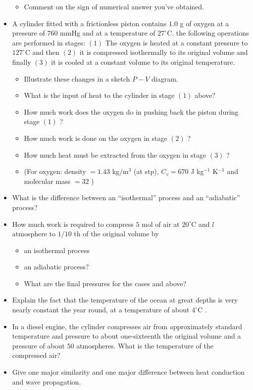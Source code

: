 \documentclass{article}
\begin{document}
\begin{itemize}
\begin{itemize}
\item Comment on the sign of numerical answer you've obtained.
\end{itemize}
\item A cylinder fitted with a frictionless piston contains $ 1.0$ g of oxygen at a pressure of $ 760$ mmHg and at a temperature of $ 27^{\circ}$C. the following operations are performed in stages: $ (1)$ The oxygen is heated at a constant pressure to $ 127^{\circ}$C and then $ (2)$ it is compressed isothermally to its original volume and finally $ (3)$ it is cooled at a constant volume to its original temperature.
 \begin{itemize}
\item Illustrate these changes in a sketch $ P-V$ diagram.
\item What is the input of heat to the cylinder in stage $ (1)$ above?
\item How much work does the oxygen do in pushing back the piston during stage $ (1)$ ?
\item How much work is done on the oxygen in stage $ (2)$ ?
\item How much heat must be extracted from the oxygen in stage $ (3)$ ? 
\item (For oxygen: density $ =1.43$ kg$/$m$ ^{3}$ (at stp), $ C_v =670$ J kg$ ^{-1}$ K$ ^{-1}$ and molecular mass $ =32$ )
\end{itemize}
\item What is the difference between an “isothermal” process and an “adiabatic” process?
\item How much work is required to compress $ 5$ mol of air at $ 20^{\circ}$C and $ l$ atmosphere to $ 1/10$ th of the original volume by
 \begin{itemize}
\item an isothermal process
\item an adiabatic process?
\item What are the final pressures for the cases and above?
\end{itemize}
\item Explain the fact that the temperature of the ocean at great depths is very nearly constant the year round, at a temperature of about $ 4^{\circ}$C .
\item In a diesel engine, the cylinder compresses air from approximately standard temperature and pressure to about one-sixteenth the original volume and a pressure of about $ 50$ atmospheres. What is the temperature of the compressed air?
\item Give one major similarity and one major difference between heat conduction and wave propagation.

\end{itemize}
\end{document}
